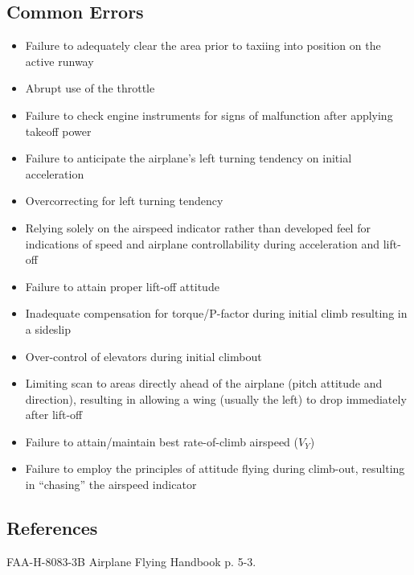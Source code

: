 \subsection{Common Errors}

\begin{itemize}
  \item Failure to adequately clear the area prior to taxiing into position on
    the active runway
  \item Abrupt use of the throttle
  \item Failure to check engine instruments for signs of malfunction after
    applying takeoff power
  \item Failure to anticipate the airplane's left turning tendency on initial
    acceleration
  \item Overcorrecting for left turning tendency
  \item Relying solely on the airspeed indicator rather than developed feel for
    indications of speed and airplane controllability during acceleration and
    lift-off
  \item Failure to attain proper lift-off attitude
  \item Inadequate compensation for torque/P-factor during initial climb
    resulting in a sideslip
  \item Over-control of elevators during initial climbout
  \item Limiting scan to areas directly ahead of the airplane (pitch attitude
    and direction), resulting in allowing a wing (usually the left) to drop
    immediately after lift-off
  \item Failure to attain/maintain best rate-of-climb airspeed ($V_Y$)
  \item Failure to employ the principles of attitude flying during climb-out,
    resulting in ``chasing'' the airspeed indicator
\end{itemize}

\subsection{References}

FAA-H-8083-3B Airplane Flying Handbook p. 5-3.
